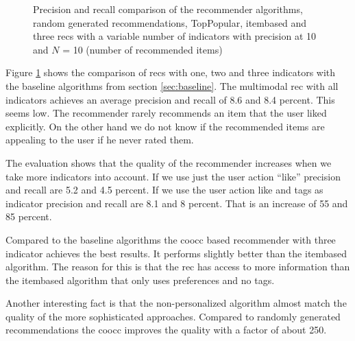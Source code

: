 \pgfplotsset{width=7cm}
\begin{figure}
  \centering
{} 
\caption{Precision and recall comparison of the recommender algorithms, random generated recommendations, TopPopular, itembased  and three \glspl{rec} with a variable number of indicators with precision at 10 and $N$ = 10 (number of recommended items)}
  \label{fig:precisionrecallvalues}
\end{figure}

Figure \ref{fig:precisionrecallvalues} shows the comparison of \glspl{rec} with one, two and three indicators with the baseline algorithms from section \ref{sec:baseline}.
The multimodal \gls{rec} with all indicators achieves an average precision and recall of 8.6 and 8.4 percent. This seems low. The recommender rarely recommends an item that the user liked explicitly. On the other hand we do not know if the recommended items are appealing to the user if he never rated them.

The evaluation shows that the quality of the recommender increases when we take more indicators into account. If we use just the user action ``like'' precision and recall are 5.2 and 4.5 percent. If we use the user action like and \glspl{tag} as indicator precision and recall are  8.1 and 8 percent. That is an increase of 55 and 85 percent.

Compared to the baseline algorithms the \gls{coocc} based recommender with three indicator achieves the best results. It performs slightly better than the \gls{itembased} algorithm. The reason for this is that the \gls{rec} has access to more information than the \gls{itembased} algorithm that only uses preferences and no tags.

Another interesting fact is that the non-personalized algorithm almost match the quality of the more sophisticated approaches. Compared to randomly generated recommendations the \gls{coocc} improves the quality with a factor of about 250.
